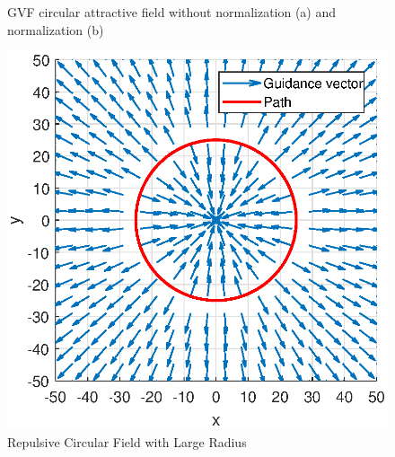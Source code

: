 \documentclass[numbered,pdftex]{ohio-etd}
\begin{document}
\begin{figure}[H]
	\begin{subfigmatrix}{2}%
		\centering	
		\hspace*{0mm}
	\end{subfigmatrix}
	\caption{GVF circular attractive field without normalization (a) and normalization (b)}
	\label{fig:gvfCircAttractive}
\end{figure}

\begin{figure}[H]
	\centering
	\includegraphics[width=0.7\linewidth]{Figures/methods/largeRepulsive}
	\caption{Repulsive Circular Field with Large Radius}
	\label{fig:largerepulsive}
\end{figure}
\end{document}
